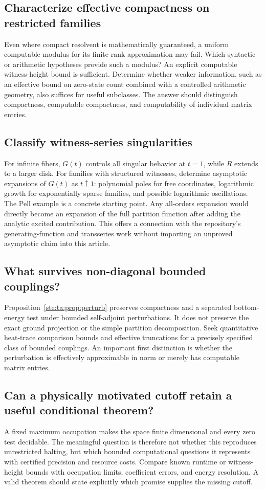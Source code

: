 \documentclass[11pt,letterpaper]{article}
\theoremstyle{definition}
\theoremstyle{remark}
\begin{document}
\subsection{Characterize effective compactness on restricted families}\label{ste:ta:q:effective}
Even where compact resolvent is mathematically guaranteed, a uniform computable modulus for its finite-rank approximation may fail. Which syntactic or arithmetic hypotheses provide such a modulus? An explicit computable witness-height bound is sufficient. Determine whether weaker information, such as an effective bound on zero-state count combined with a controlled arithmetic geometry, also suffices for useful subclasses. The answer should distinguish compactness, computable compactness, and computability of individual matrix entries.

\subsection{Classify witness-series singularities}\label{ste:ta:q:singularities}
For infinite fibers, $G(t)$ controls all singular behavior at $t=1$, while $R$ extends to a larger disk. For families with structured witnesses, determine asymptotic expansions of $G(t)$ as $t\uparrow1$: polynomial poles for free coordinates, logarithmic growth for exponentially sparse families, and possible logarithmic oscillations. The Pell example is a concrete starting point. Any all-orders expansion would directly become an expansion of the full partition function after adding the analytic excited contribution. This offers a connection with the repository's generating-function and transseries work without importing an unproved asymptotic claim into this article.

\subsection{What survives non-diagonal bounded couplings?}\label{ste:ta:q:couplings}
Proposition~\ref{ste:ta:prop:perturb} preserves compactness and a separated bottom-energy test under bounded self-adjoint perturbations. It does not preserve the exact ground projection or the simple partition decomposition. Seek quantitative heat-trace comparison bounds and effective truncations for a precisely specified class of bounded couplings. An important first distinction is whether the perturbation is effectively approximable in norm or merely has computable matrix entries.

\subsection{Can a physically motivated cutoff retain a useful conditional theorem?}\label{ste:ta:q:cutoff}
A fixed maximum occupation makes the space finite dimensional and every zero test decidable. The meaningful question is therefore not whether this reproduces unrestricted halting, but which bounded computational questions it represents with certified precision and resource costs. Compare known runtime or witness-height bounds with occupation limits, coefficient errors, and energy resolution. A valid theorem should state explicitly which promise supplies the missing cutoff.
\end{document}
